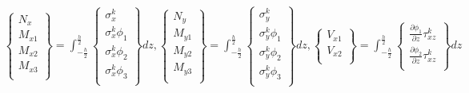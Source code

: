 \documentclass{article}
\begin{document}
\begin{equation}
\begin{matrix}
    \begin{Bmatrix}
            N_x \\
            M_{x1} \\
            M_{x2} \\
            M_{x3} \\
    \end{Bmatrix} = 
    \displaystyle\int_{-\frac{h}{2}}^{\frac{h}{2}}
    \begin{Bmatrix}
            \sigma_x^k \\
            \sigma_x^k \phi_1 \\
            \sigma_x^k \phi_2 \\
            \sigma_x^k \phi_3 \\
    \end{Bmatrix}
    dz,
    \begin{Bmatrix}
            N_y \\
            M_{y1} \\
            M_{y2} \\
            M_{y3} \\
    \end{Bmatrix} = 
    \displaystyle\int_{-\frac{h}{2}}^{\frac{h}{2}}
    \begin{Bmatrix}
            \sigma_y^k \\
            \sigma_y^k \phi_1 \\
            \sigma_y^k \phi_2 \\
            \sigma_y^k \phi_3 \\
    \end{Bmatrix}
    dz,
        \begin{Bmatrix}
            V_{x1} \\
            V_{x2} \\
    \end{Bmatrix} = 
    \displaystyle\int_{-\frac{h}{2}}^{\frac{h}{2}}
    \begin{Bmatrix}
            \displaystyle\frac{\partial \phi_1}{\partial z}\tau_{xz}^k \\
            \displaystyle\frac{\partial \phi_2}{\partial z}\tau_{xz}^k \\
    \end{Bmatrix}
    dz
\end{matrix}
\label{eq:resultant}
\end{equation}
\end{document}

